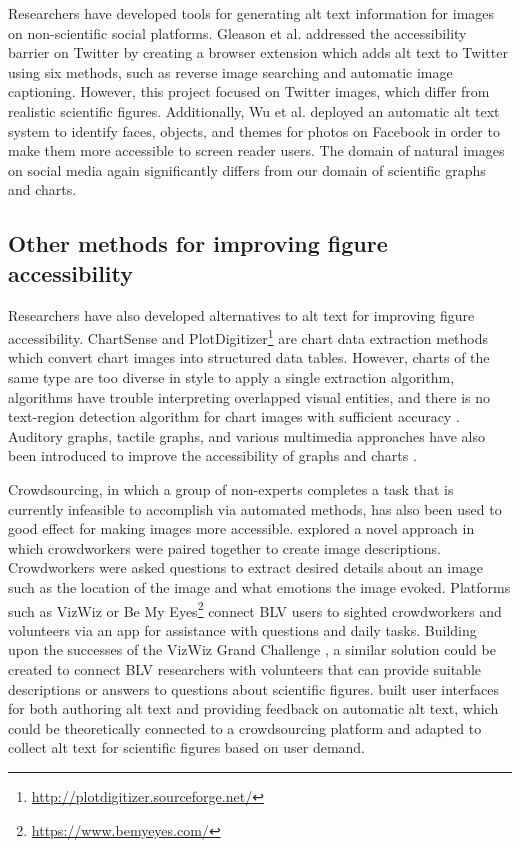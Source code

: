 \documentclass[sigconf]{acmart}
\begin{document}
Researchers have developed tools for generating alt text information for images on non-scientific social platforms.
Gleason et al. \cite{Gleason2020TwitterAA} addressed the accessibility barrier on Twitter by creating a browser extension which adds alt text to Twitter using six methods, such as reverse image searching and automatic image captioning. However, this project focused on Twitter images, which differ from realistic scientific figures. Additionally, Wu et al. \cite{Wu2017AutomaticAC} deployed an automatic alt text system to identify faces, objects, and themes for photos on Facebook in order to make them more accessible to screen reader users. The domain of natural images on social media again significantly differs from our domain of scientific graphs and charts. 



\subsection{Other methods for improving figure accessibility}
\label{sec:rw_other}

Researchers have also developed alternatives to alt text for improving figure accessibility. ChartSense \cite{Jung2017ChartSenseID} and PlotDigitizer\footnote{\href{http://plotdigitizer.sourceforge.net/}{http://plotdigitizer.sourceforge.net/}} are chart data extraction methods which convert chart images into structured data tables. However, charts of the same type are too diverse in style to apply a single extraction algorithm, algorithms have trouble interpreting overlapped visual entities, and there is no text-region detection algorithm for chart images with sufficient accuracy \cite{Jung2017ChartSenseID}. Auditory graphs, tactile graphs, and various multimedia approaches have also been introduced to improve the accessibility of graphs and charts \cite{Engel2017ImproveTA, Nazemi2013AMT}.



Crowdsourcing, in which a group of non-experts completes a task that is currently infeasible to accomplish via automated methods, has also been used to good effect for making images more accessible. \citet{Salisbury2017TowardSS} explored a novel approach in which crowdworkers were paired together to create image descriptions. Crowdworkers were asked questions to extract desired details about an image such as the location of the image and what emotions the image evoked. Platforms such as VizWiz \citep{Bigham2010VizWizNR} or Be My Eyes\footnote{\href{https://www.bemyeyes.com/}{https://www.bemyeyes.com/}} connect BLV users to sighted crowdworkers and volunteers via an app for assistance with questions and daily tasks. Building upon the successes of the VizWiz Grand Challenge \citep{Gurari2018VizWizGC}, a similar solution could be created to connect BLV researchers with volunteers that can provide suitable descriptions or answers to questions about scientific figures. \citet{Mack2021DesigningTF} built user interfaces for both authoring alt text and providing feedback on automatic alt text, which could be theoretically connected to a crowdsourcing platform and adapted to collect alt text for scientific figures based on user demand.
\end{document}

